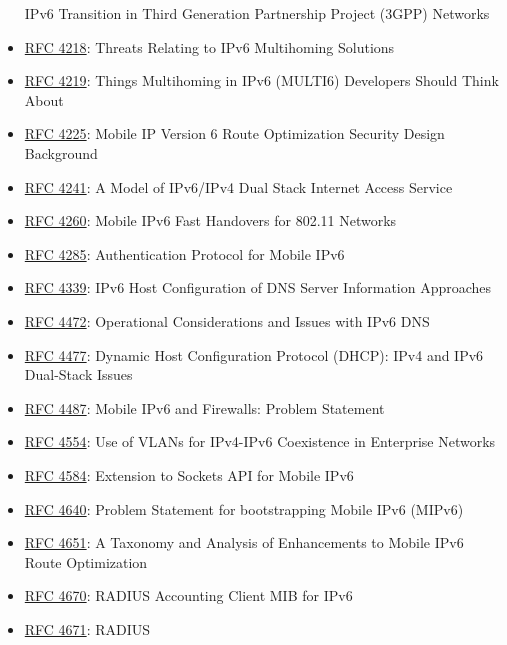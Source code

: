 \documentclass[
]{article}
\begin{document}
\begin{itemize}
  IPv6 Transition in Third Generation Partnership Project (3GPP)
  Networks
\item
  \href{https://www.rfc-editor.org/info/rfc4218}{RFC 4218}: Threats
  Relating to IPv6 Multihoming Solutions
\item
  \href{https://www.rfc-editor.org/info/rfc4219}{RFC 4219}: Things
  Multihoming in IPv6 (MULTI6) Developers Should Think About
\item
  \href{https://www.rfc-editor.org/info/rfc4225}{RFC 4225}: Mobile IP
  Version 6 Route Optimization Security Design Background
\item
  \href{https://www.rfc-editor.org/info/rfc4241}{RFC 4241}: A Model of
  IPv6/IPv4 Dual Stack Internet Access Service
\item
  \href{https://www.rfc-editor.org/info/rfc4260}{RFC 4260}: Mobile IPv6
  Fast Handovers for 802.11 Networks
\item
  \href{https://www.rfc-editor.org/info/rfc4285}{RFC 4285}:
  Authentication Protocol for Mobile IPv6
\item
  \href{https://www.rfc-editor.org/info/rfc4339}{RFC 4339}: IPv6 Host
  Configuration of DNS Server Information Approaches
\item
  \href{https://www.rfc-editor.org/info/rfc4472}{RFC 4472}: Operational
  Considerations and Issues with IPv6 DNS
\item
  \href{https://www.rfc-editor.org/info/rfc4477}{RFC 4477}: Dynamic Host
  Configuration Protocol (DHCP): IPv4 and IPv6 Dual-Stack Issues
\item
  \href{https://www.rfc-editor.org/info/rfc4487}{RFC 4487}: Mobile IPv6
  and Firewalls: Problem Statement
\item
  \href{https://www.rfc-editor.org/info/rfc4554}{RFC 4554}: Use of VLANs
  for IPv4-IPv6 Coexistence in Enterprise Networks
\item
  \href{https://www.rfc-editor.org/info/rfc4584}{RFC 4584}: Extension to
  Sockets API for Mobile IPv6
\item
  \href{https://www.rfc-editor.org/info/rfc4640}{RFC 4640}: Problem
  Statement for bootstrapping Mobile IPv6 (MIPv6)
\item
  \href{https://www.rfc-editor.org/info/rfc4651}{RFC 4651}: A Taxonomy
  and Analysis of Enhancements to Mobile IPv6 Route Optimization
\item
  \href{https://www.rfc-editor.org/info/rfc4670}{RFC 4670}: RADIUS
  Accounting Client MIB for IPv6
\item
  \href{https://www.rfc-editor.org/info/rfc4671}{RFC 4671}: RADIUS

\end{itemize}
\end{document}
